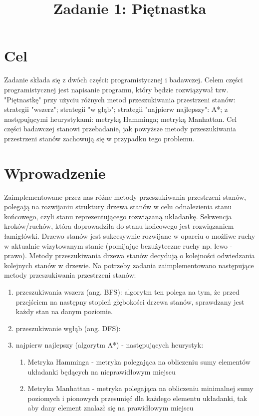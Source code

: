 \documentclass{classrep}
\author{
  \studentinfo{Marek Maras}{210267} \and
  \studentinfo{Krzysztof Pilcicki}{210291}
}
\title{Zadanie 1: Piętnastka}
\begin{document}
\maketitle

\section{Cel}

Zadanie składa się z dwóch części: programistycznej i badawczej.
Celem części programistycznej jest napisanie programu, który będzie rozwiązywał tzw. "Piętnastkę" przy użyciu różnych metod przeszukiwania przestrzeni stanów:
strategii "wszerz";
strategii "w głąb";
strategii "najpierw najlepszy": A*;
z następującymi heurystykami:
metryką Hamminga;
metryką Manhattan.
Cel części badawczej stanowi przebadanie, jak powyższe metody przeszukiwania przestrzeni stanów zachowują się w przypadku tego problemu.

\section{Wprowadzenie}

Zaimplementowane przez nas różne metody przeszukiwania przestrzeni stanów, polegają na rozwijaniu struktury drzewa stanów w celu odnalezienia stanu końcowego, czyli stanu reprezentującego rozwiązaną układankę. Sekwencja kroków/ruchów, która doprowadziła do stanu końcowego jest rozwiązaniem łamigłówki. Drzewo stanów jest sukcesywnie rozwijane w oparciu o możliwe ruchy w aktualnie wizytowanym stanie (pomijając bezużyteczne ruchy np. lewo - prawo). Metody przeszukiwania drzewa stanów decydują o kolejności odwiedzania kolejnych stanów w drzewie.
\newpage
Na potrzeby zadania zaimplementowano następujące metody przeszukiwania przestrzeni stanów:

\begin{enumerate}
    \item przeszukiwania wszerz (ang. BFS):
             algorytm ten polega na tym, że przed przejściem na następny stopień głębokości drzewa stanów, sprawdzany jest każdy stan na danym poziomie.
             \vspace{1ex}
    \item przeszukiwanie wgłąb (ang. DFS):
    \vspace{1ex}
    \item najpierw najlepszy (algorytm A*) -
         następujących heurystyk:  
        \begin{enumerate}
            \item Metryka Hamminga - metryka polegająca na obliczeniu sumy elementów układanki będących na nieprawidłowym miejscu
            \item Metryka Manhattan - metryka polegająca na obliczeniu minimalnej sumy poziomych i pionowych  przesunięć dla każdego elementu układanki, tak aby dany element znalazł się na prawidłowym miejscu    
        \end{enumerate}
\end{enumerate}
\end{document}

